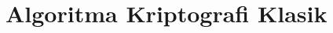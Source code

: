 \documentclass[../main.tex]{subfiles}
\begin{document}
\chapter{Algoritma Kriptografi Klasik}
\end{document}

